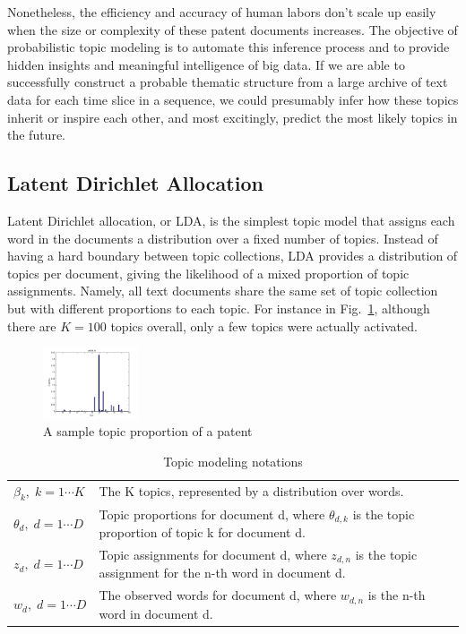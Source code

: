 \documentclass[conference]{IEEEtran}
\begin{document}
Nonetheless, the efficiency and accuracy of human labors don't scale up easily when the size or complexity of these patent documents increases. The objective of probabilistic topic modeling is to automate this inference process and to provide hidden insights and meaningful intelligence of big data. If we are able to successfully construct a probable thematic structure from a large archive of text data for each time slice in a sequence, we could presumably infer how these topics inherit or inspire each other, and most excitingly, predict the most likely topics in the future.




\subsection{Latent Dirichlet Allocation}
Latent Dirichlet allocation, or LDA, is the simplest topic model \cite{lda2003} that assigns each word in the documents a distribution over a fixed number of topics. Instead of having a hard boundary between topic collections, LDA provides a distribution of topics per document, giving the likelihood of a mixed proportion of topic assignments. Namely, all text documents share the same set of topic collection but with different proportions to each topic. For instance in Fig.~\ref{topic_proportion}, although there are $K=100$ topics overall, only a few topics were actually activated.

\begin{figure}[h]
	\center
	\includegraphics[width=0.25\textwidth]{fig/pat8_topics.png}
	\caption{A sample topic proportion of a patent}
	\label{topic_proportion}
\end{figure}




\begin{table}[h]
	\center
	\begin{tabular}{l p{5.5cm}}
$\beta_k,\; k = 1 \cdots K$& The K topics, represented by a distribution over words.\\
$\theta_d,\; d = 1 \cdots D$& Topic proportions for document d, where $\theta_{d,k}$ is the topic proportion of topic k for document d.\\
$z_d,\; d = 1 \cdots D$& Topic assignments for document d, where $z_{d,n}$ is the topic assignment for the n-th word in document d.\\
$w_d,\; d = 1 \cdots D$& The observed words for document d, where $w_{d,n}$ is the n-th word in document d.\\
	\end{tabular}
	\caption{Topic modeling notations}
	\label{tm_notations}
\end{table}
	
\end{document}
